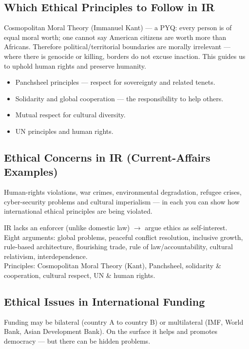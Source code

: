 \subsection{Which Ethical Principles to Follow in IR}
\begin{PYQLink}
Cosmopolitan Moral Theory (Immanuel Kant) --- a PYQ: every person is of equal moral worth; one cannot say American citizens are worth more than Africans. Therefore political/territorial boundaries are morally irrelevant --- where there is genocide or killing, borders do not excuse inaction. This guides us to uphold human rights and preserve humanity.
\end{PYQLink}
\begin{itemize}
\item Panchsheel principles --- respect for sovereignty and related tenets.
\item Solidarity and global cooperation --- the responsibility to help others.
\item Mutual respect for cultural diversity.
\item UN principles and human rights.
\end{itemize}

\subsection{Ethical Concerns in IR (Current-Affairs Examples)}
Human-rights violations, war crimes, environmental degradation, refugee crises, cyber-security problems and cultural imperialism --- in each you can show how international ethical principles are being violated.

\begin{QuickRevision}
IR lacks an enforcer (unlike domestic law) $\rightarrow$ argue ethics as self-interest.\\
Eight arguments: global problems, peaceful conflict resolution, inclusive growth, rule-based architecture, flourishing trade, rule of law/accountability, cultural relativism, interdependence.\\
Principles: Cosmopolitan Moral Theory (Kant), Panchsheel, solidarity \& cooperation, cultural respect, UN \& human rights.
\end{QuickRevision}

\subsection{Ethical Issues in International Funding}
Funding may be bilateral (country A to country B) or multilateral (IMF, World Bank, Asian Development Bank). On the surface it helps and promotes democracy --- but there can be hidden problems.

